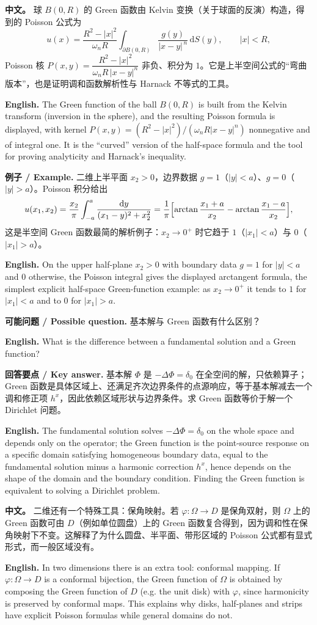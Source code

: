 \documentclass[UTF8,11pt,a4paper]{ctexart}
\newcommand{\APS}[2]{\par\noindent\textbf{中文。} #1\par\noindent\textbf{English.} #2\par\smallskip}
\newcommand{\EN}[1]{\par\noindent \textbf{English.} #1\par}
\newcommand{\EX}[2]{\par\noindent \textbf{例子 / Example.} #1\par\EN{#2}}
\newcommand{\ASK}[4]{\par\noindent \textbf{可能问题 / Possible question.} #1\par\EN{#2}\noindent \textbf{回答要点 / Key answer.} #3\par\EN{#4}\medskip}
\newcommand{\dd}{\mathrm{d}}
\begin{document}
\APS{球 $B(0,R)$ 的 Green 函数由 Kelvin 变换（关于球面的反演）构造，得到的 Poisson 公式为
\[
u(x)=\frac{R^2-|x|^2}{\omega_n R}\int_{\partial B(0,R)}\frac{g(y)}{|x-y|^{\,n}}\,\dd S(y),\qquad |x|<R,
\]
Poisson 核 $P(x,y)=\dfrac{R^2-|x|^2}{\omega_n R\,|x-y|^n}$ 非负、积分为 $1$。它是上半空间公式的``弯曲版本''，也是证明调和函数解析性与 Harnack 不等式的工具。}{The Green function of the ball $B(0,R)$ is built from the Kelvin transform (inversion in the sphere), and the resulting Poisson formula is displayed, with kernel $P(x,y)=(R^2-|x|^2)/(\omega_nR|x-y|^n)$ nonnegative and of integral one. It is the ``curved'' version of the half-space formula and the tool for proving analyticity and Harnack's inequality.}

\EX{二维上半平面 $x_2>0$，边界数据 $g=1$（$|y|<a$）、$g=0$（$|y|>a$）。Poisson 积分给出
\[
u(x_1,x_2)=\frac{x_2}{\pi}\int_{-a}^{a}\frac{\dd y}{(x_1-y)^2+x_2^2}
=\frac{1}{\pi}\Bigl[\arctan\frac{x_1+a}{x_2}-\arctan\frac{x_1-a}{x_2}\Bigr],
\]
这是半空间 Green 函数最简的解析例子：$x_2\to0^+$ 时它趋于 $1$（$|x_1|<a$）与 $0$（$|x_1|>a$）。}{On the upper half-plane $x_2>0$ with boundary data $g=1$ for $|y|<a$ and $0$ otherwise, the Poisson integral gives the displayed arctangent formula, the simplest explicit half-space Green-function example: as $x_2\to0^+$ it tends to $1$ for $|x_1|<a$ and to $0$ for $|x_1|>a$.}

\ASK{基本解与 Green 函数有什么区别？}{What is the difference between a fundamental solution and a Green function?}{基本解 $\Phi$ 是 $-\Delta\Phi=\delta_0$ 在全空间的解，只依赖算子；Green 函数是具体区域上、还满足齐次边界条件的点源响应，等于基本解减去一个调和修正项 $h^x$，因此依赖区域形状与边界条件。求 Green 函数等价于解一个 Dirichlet 问题。}{The fundamental solution solves $-\Delta\Phi=\delta_0$ on the whole space and depends only on the operator; the Green function is the point-source response on a specific domain satisfying homogeneous boundary data, equal to the fundamental solution minus a harmonic correction $h^x$, hence depends on the shape of the domain and the boundary condition. Finding the Green function is equivalent to solving a Dirichlet problem.}

\APS{二维还有一个特殊工具：保角映射。若 $\varphi:\Omega\to D$ 是保角双射，则 $\Omega$ 上的 Green 函数可由 $D$（例如单位圆盘）上的 Green 函数复合得到，因为调和性在保角映射下不变。这解释了为什么圆盘、半平面、带形区域的 Poisson 公式都有显式形式，而一般区域没有。}{In two dimensions there is an extra tool: conformal mapping. If $\varphi:\Omega\to D$ is a conformal bijection, the Green function of $\Omega$ is obtained by composing the Green function of $D$ (e.g. the unit disk) with $\varphi$, since harmonicity is preserved by conformal maps. This explains why disks, half-planes and strips have explicit Poisson formulas while general domains do not.}
\end{document}

